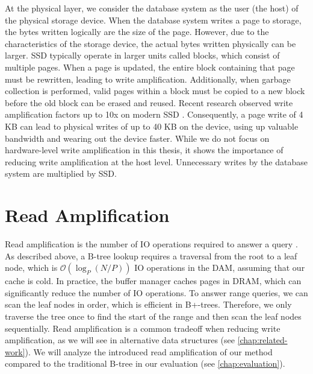 At the physical layer, we consider the database system as the user (the host) of the physical storage device.
When the database system writes a page to storage, the bytes written logically are the size of the page.
However, due to the characteristics of the storage device, the actual bytes written physically can be larger.
\ac{SSD} typically operate in larger units called blocks, which consist of multiple pages.
When a page is updated, the entire block containing that page must be rewritten, leading to write amplification.
Additionally, when garbage collection is performed, valid pages within a block must be copied to a new block before the old block can be erased and reused.
Recent research observed write amplification factors up to 10x on modern \ac{SSD} \cite{haas2025ssd}.
Consequently, a page write of 4 KB can lead to physical writes of up to 40 KB on the device, using up valuable bandwidth and wearing out the device faster.
While we do not focus on hardware-level write amplification in this thesis, it shows the importance of reducing write amplification at the host level.
Unnecessary writes by the database system are multiplied by \ac{SSD}.


\section{Read Amplification}
\label{sec:read-amplification-background}
Read amplification is the number of \ac{IO} operations required to answer a query \cite{kuszmaul2014fractal}.
As described above, a B-tree lookup requires a traversal from the root to a leaf node, which is $\mathcal{O}(\log_P(N/P))$ \ac{IO} operations in the \ac{DAM}, assuming that our cache is cold.
In practice, the buffer manager caches pages in \ac{DRAM}, which can significantly reduce the number of \ac{IO} operations.
To answer range queries, we can scan the leaf nodes in order, which is efficient in B+-trees.
Therefore, we only traverse the tree once to find the start of the range and then scan the leaf nodes sequentially.
Read amplification is a common tradeoff when reducing write amplification, as we will see in alternative data structures (see \autoref{chap:related-work}).
We will analyze the introduced read amplification of our method compared to the traditional B-tree in our evaluation (see \autoref{chap:evaluation}).

